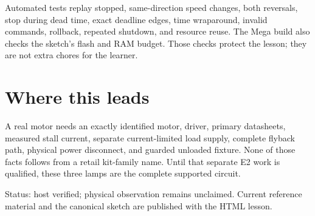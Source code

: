 \documentclass[11pt]{article}
\begin{document}
Automated tests replay stopped, same-direction speed changes, both reversals,
stop during dead time, exact deadline edges, time wraparound, invalid commands,
rollback, repeated shutdown, and resource reuse. The Mega build also checks
the sketch's flash and RAM budget. Those checks protect the lesson; they are
not extra chores for the learner.

\section{Where this leads}

A real motor needs an exactly identified motor, driver, primary datasheets,
measured stall current, separate current-limited load supply, complete flyback
path, physical power disconnect, and guarded unloaded fixture. None of those
facts follows from a retail kit-family name. Until that separate E2 work is
qualified, these three lamps are the complete supported circuit.

\vfill
\small
Status: host verified; physical observation remains unclaimed. Current
reference material and the canonical sketch are published with the HTML
lesson.
\end{document}
